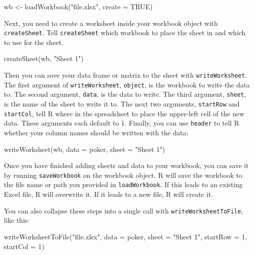 \documentclass[
  letterpaper,
  DIV=11,
  numbers=noendperiod]{scrbook}
\newenvironment{Shaded}{\begin{snugshade}}{\end{snugshade}}
\newcommand{\AttributeTok}[1]{\textcolor[rgb]{0.40,0.45,0.13}{#1}}
\newcommand{\ConstantTok}[1]{\textcolor[rgb]{0.56,0.35,0.01}{#1}}
\newcommand{\DecValTok}[1]{\textcolor[rgb]{0.68,0.00,0.00}{#1}}
\newcommand{\FunctionTok}[1]{\textcolor[rgb]{0.28,0.35,0.67}{#1}}
\newcommand{\NormalTok}[1]{\textcolor[rgb]{0.00,0.23,0.31}{#1}}
\newcommand{\OtherTok}[1]{\textcolor[rgb]{0.00,0.23,0.31}{#1}}
\newcommand{\StringTok}[1]{\textcolor[rgb]{0.13,0.47,0.30}{#1}}
\begin{document}
\begin{Shaded}
\begin{Highlighting}[]
\NormalTok{wb }\OtherTok{\textless{}{-}} \FunctionTok{loadWorkbook}\NormalTok{(}\StringTok{"file.xlsx"}\NormalTok{, }\AttributeTok{create =} \ConstantTok{TRUE}\NormalTok{)}
\end{Highlighting}
\end{Shaded}

Next, you need to create a worksheet inside your workbook object with
\texttt{createSheet}. Tell \texttt{createSheet} which workbook to place
the sheet in and which to use for the sheet.

\begin{Shaded}
\begin{Highlighting}[]
\FunctionTok{createSheet}\NormalTok{(wb, }\StringTok{"Sheet 1"}\NormalTok{)}
\end{Highlighting}
\end{Shaded}

Then you can save your data frame or matrix to the sheet with
\texttt{writeWorksheet}. The first argument of \texttt{writeWorksheet},
\texttt{object}, is the workbook to write the data to. The second
argument, \texttt{data}, is the data to write. The third argument,
\texttt{sheet}, is the name of the sheet to write it to. The next two
arguments, \texttt{startRow} and \texttt{startCol}, tell R where in the
spreadsheet to place the upper-left cell of the new data. These
arguments each default to 1. Finally, you can use \texttt{header} to
tell R whether your column names should be written with the data:

\begin{Shaded}
\begin{Highlighting}[]
\FunctionTok{writeWorksheet}\NormalTok{(wb, }\AttributeTok{data =}\NormalTok{ poker, }\AttributeTok{sheet =} \StringTok{"Sheet 1"}\NormalTok{)}
\end{Highlighting}
\end{Shaded}

Once you have finished adding sheets and data to your workbook, you can
save it by running \texttt{saveWorkbook} on the workbook object. R will
save the workbook to the file name or path you provided in
\texttt{loadWorkbook}. If this leads to an existing Excel file, R will
overwrite it. If it leads to a new file, R will create it.

You can also collapse these steps into a single call with
\texttt{writeWorksheetToFile}, like this:

\begin{Shaded}
\begin{Highlighting}[]
\FunctionTok{writeWorksheetToFile}\NormalTok{(}\StringTok{"file.xlsx"}\NormalTok{, }\AttributeTok{data =}\NormalTok{ poker, }\AttributeTok{sheet =} \StringTok{"Sheet 1"}\NormalTok{, }
  \AttributeTok{startRow =} \DecValTok{1}\NormalTok{, }\AttributeTok{startCol =} \DecValTok{1}\NormalTok{)}
\end{Highlighting}
\end{Shaded}
\end{document}
